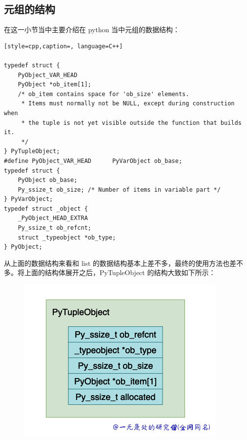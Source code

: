 \subsection{元组的结构}
在这一小节当中主要介绍在 python 当中元组的数据结构：
\begin{lstlisting}[style=cpp,caption=, language=C++]

typedef struct {
    PyObject_VAR_HEAD
    PyObject *ob_item[1];
    /* ob_item contains space for 'ob_size' elements.
     * Items must normally not be NULL, except during construction when
     * the tuple is not yet visible outside the function that builds it.
     */
} PyTupleObject;
#define PyObject_VAR_HEAD      PyVarObject ob_base;
typedef struct {
    PyObject ob_base;
    Py_ssize_t ob_size; /* Number of items in variable part */
} PyVarObject;
typedef struct _object {
    _PyObject_HEAD_EXTRA
    Py_ssize_t ob_refcnt;
    struct _typeobject *ob_type;
} PyObject;
\end{lstlisting}
从上面的数据结构来看和 list 的数据结构基本上差不多，最终的使用方法也差不多。将上面的结构体展开之后，PyTupleObject 的结构大致如下所示：

    \begin{figure}[h]
        \centering
            \includegraphics[scale=.5]{images/09-tuple.png}
            \caption{ }
        \label{fig:my_label}
    \end{figure}
    

